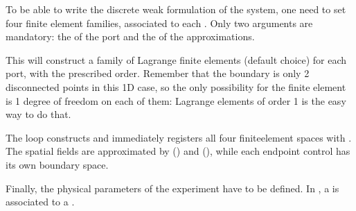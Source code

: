 \documentclass[letterpaper,10pt,english]{sphinxmanual}
\begin{document}
\sphinxAtStartPar
To be able to write the discrete weak formulation of the system, one
need to set four finite element families, associated to each .
Only two arguments are mandatory: the  of the port and the
 of the approximations.

\begin{sphinxVerbatim}[commandchars=\\\{\}]
   
       
     
     
\end{sphinxVerbatim}

\sphinxAtStartPar
This will construct a family of Lagrange finite elements (default
choice) for each port, with the prescribed order. Remember that the
boundary is only 2 disconnected points in this 1D case, so the only
possibility for the finite element is 1 degree of freedom on each of
them: Lagrange elements of order 1 is the easy way to do that.

\sphinxAtStartPar
The loop constructs and immediately registers all four finite\sphinxhyphen{}element
spaces with . The spatial fields are
approximated by  () and  (),
while each endpoint control has its own boundary space.

\sphinxAtStartPar
Finally, the physical parameters of the experiment have to be defined.
In , a  is associated to a .
\end{document}
